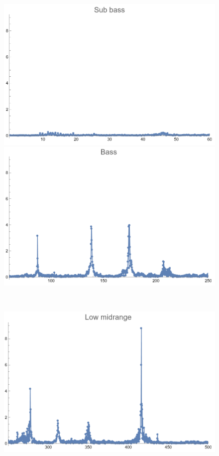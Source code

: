 \documentclass[12pt, letterpaper]{article}
\begin{document}
\begin{figure}[H]
  \centering
  \begin{minipage}{.3\textwidth}
    \centering
    \includegraphics[width=.9\linewidth]{imgs/Cancion8/subbass.png}
  \end{minipage}
  \begin{minipage}{0.03\textwidth}\end{minipage}
  \begin{minipage}{.3\textwidth}
    \centering
    \includegraphics[width=.9\linewidth]{imgs/Cancion8/bass.png}
  \end{minipage} \medskip \\
  \begin{minipage}{.3\textwidth}
    \centering
    \includegraphics[width=.9\linewidth]{imgs/Cancion8/lowmid.png}

\end{minipage}
\end{figure}
\end{document}
